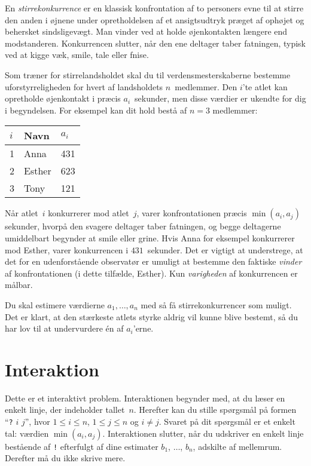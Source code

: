 

\noindent
En \emph{stirrekonkurrence} er en klassisk konfrontation af to personers evne til at stirre den anden i øjnene under opretholdelsen af et ansigtsudtryk præget af ophøjet og behersket sindsligevægt.
Man vinder ved at holde øjenkontakten længere end modstanderen.
Konkurrencen slutter, når den ene deltager taber fatningen, typisk ved at kigge væk, smile, tale eller fnise.

Som træner for stirre\-lands\-holdet skal du til verdensmesterskaberne bestemme uforstyrreligheden for hvert af landsholdets $n$~medlemmer.
Den $i$'te atlet kan opretholde øjenkontakt i præcis $a_i$~sekunder, men disse værdier er ukendte for dig i begyndelsen.
For eksempel kan dit hold bestå af $n=3$ medlemmer:

\medskip
\begin{tabular}{lll}
$i$ & Navn & $a_i$\\\hline
1 & Anna & 431 \\
2 & Esther & 623 \\
3 & Tony & 121
\end{tabular}

\medskip
Når atlet~$i$ konkurrerer mod atlet~$j$, varer konfrontationen præcis $\min(a_i, a_j)$ sekunder, hvorpå den svagere deltager taber fatningen, og begge deltagerne umiddelbart begynder at smile eller grine.
Hvis Anna for eksempel konkurrerer mod Esther, varer konkurrencen i $431$~sekunder.
Det er vigtigt at understrege, at det for en udenforstående observatør er umuligt at bestemme den faktiske \emph{vinder} af konfrontationen (i dette tilfælde, Esther).
Kun \emph{varigheden} af konkurrencen er målbar.

Du skal estimere værdierne $a_1,\ldots, a_n$ med så få stirrekonkurrencer som muligt.
Det er klart, at den stærkeste atlets styrke aldrig vil kunne blive bestemt, så du har lov til at undervurdere én af $a_i$'erne.

\section*{Interaktion}

Dette er et interaktivt problem.
Interaktionen begynder med, at du læser en enkelt linje, der indeholder tallet~$n$.
Herefter kan du stille spørgsmål på formen ``\texttt{?} $i$ $j$'', hvor $1\leq i\leq n$, $1\leq j\leq n$ og $i\neq j$.
Svaret på dit spørgsmål er et enkelt tal: værdien $\min(a_i, a_j)$.
Interaktionen slutter, når du udskriver en enkelt linje bestående af \texttt{!} efterfulgt af dine estimater $b_1$, $\ldots$, $b_n$, adskilte af mellemrum.
Derefter må du ikke skrive mere.

